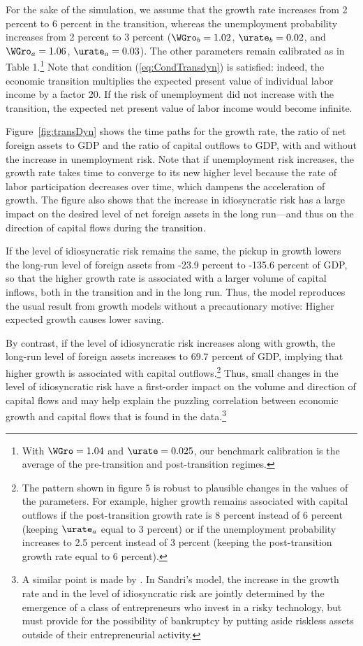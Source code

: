 \documentclass[titlepage]{\econtex}\newcommand{\texname}{cjSOE}
\begin{document}
For the sake of the simulation, we assume that the growth rate
increases from 2 percent to 6 percent in the transition, whereas the
unemployment probability increases from 2 percent to 3 percent
($\WGro_b=1.02$, $\urate_b=0.02$, and $\WGro_a=1.06$,
$\urate_a=0.03$). The other parameters remain calibrated as in Table
1.\footnote{With $\WGro=1.04$ and $\urate=0.025$, our benchmark
  calibration is the average of the pre-transition and post-transition
  regimes.} Note that condition (\ref{eq:CondTransdyn}) is satisfied:
indeed, the economic transition multiplies the expected present value
of individual labor income by a factor 20. If the risk of unemployment
did not increase with the transition, the expected net present value
of labor income would become infinite.

Figure~\ref{fig:transDyn} shows the time paths for the growth rate,
the ratio of net foreign assets to GDP and the ratio of capital
outflows to GDP, with and without the increase in unemployment
risk. Note that if unemployment risk increases, the growth rate takes
time to converge to its new higher level because the rate of labor
participation decreases over time, which dampens the acceleration of
growth. The figure also shows that the increase in idiosyncratic risk
has a large impact on the desired level of net foreign assets in the
long run---and thus on the direction of capital flows during the
transition. 

If the level of idiosyncratic risk remains the same, the
pickup in growth lowers the long-run level of foreign assets from
-23.9 percent to -135.6 percent of GDP, so that the higher growth rate
is associated with a larger volume of capital inflows, both in the
transition and in the long run. Thus, the model reproduces the usual
result from growth models without a precautionary motive: Higher expected growth
causes lower saving.

By contrast, if the level of idiosyncratic risk increases along with growth,
the long-run level of foreign assets increases to 69.7 percent of GDP,
implying that higher growth is associated with capital
outflows.\footnote{The pattern shown in figure 5 is robust to
  plausible changes in the values of the parameters. For example,
  higher growth remains associated with capital outflows if the
  post-transition growth rate is 8 percent instead of 6 percent
  (keeping $\urate_a$ equal to 3 percent) or if the unemployment
  probability increases to 2.5 percent instead of 3 percent (keeping
  the post-transition growth rate equal to 6 percent).} Thus, small
changes in the level of idiosyncratic risk have a first-order impact
on the volume and direction of capital flows and may help explain the
puzzling correlation between economic growth and capital flows that is
found in the data.\footnote{A similar point is made by
  \cite{sandri:growthcapflows}. In Sandri's model, the increase in the
  growth rate and in the level of idiosyncratic risk are jointly
  determined by the emergence of a class of entrepreneurs who invest
  in a risky technology, but must provide for the possibility of
  bankruptcy by putting aside riskless assets outside of their
  entrepreneurial activity.}
\end{document}

